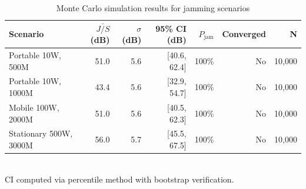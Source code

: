 \begin{table}[htbp]
\centering
\caption{Monte Carlo simulation results for jamming scenarios}
\label{tab:mc_results}
\begin{tabular}{lrrrrrr}
\toprule
Scenario & $\bar{J/S}$ (dB) & $\sigma$ (dB) & 95\% CI (dB) & $P_{\text{jam}}$ & Converged & N \\
\midrule
Portable 10W, 500M & 51.0 & 5.6 & [40.6, 62.4] & 100\% & No & 10,000 \\
Portable 10W, 1000M & 43.4 & 5.6 & [32.9, 54.7] & 100\% & No & 10,000 \\
Mobile 100W, 2000M & 51.0 & 5.6 & [40.5, 62.3] & 100\% & No & 10,000 \\
Stationary 500W, 3000M & 56.0 & 5.7 & [45.5, 67.5] & 100\% & No & 10,000 \\
\bottomrule
\end{tabular}
\\[2pt]
\footnotesize{CI computed via percentile method with bootstrap verification.}
\end{table}